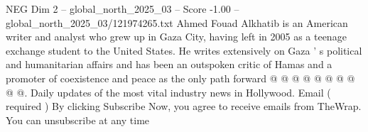 \begin{textsample}{NEG Dim 2 – global\_north\_2025\_03 – Score -1.00 – global\_north\_2025\_03/121974265.txt}
Ahmed Fouad Alkhatib is an American writer and analyst who grew up in Gaza City, having left in 2005 as a teenage exchange student to the United States.
He writes extensively on Gaza ' s political and humanitarian affairs and has been an outspoken critic of Hamas and a promoter of coexistence and peace as the only path forward @ @ @ @ @ @ @ @ @ @.
Daily updates of the most vital industry news in Hollywood.
Email ( required ) By clicking Subscribe Now, you agree to receive emails from TheWrap.
You can unsubscribe at any time

\end{textsample}
